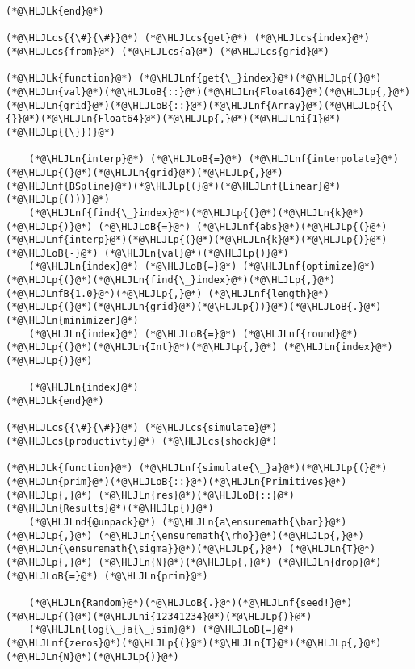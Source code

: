 \documentclass[12pt,a4paper]{article}
\newcommand{\HLJLk}[1]{\textcolor[RGB]{148,91,176}{\textbf{#1}}}
\newcommand{\HLJLn}[1]{#1}
\newcommand{\HLJLnd}[1]{\textcolor[RGB]{214,102,97}{#1}}
\newcommand{\HLJLnf}[1]{\textcolor[RGB]{66,102,213}{#1}}
\newcommand{\HLJLnfB}[1]{\textcolor[RGB]{59,151,46}{#1}}
\newcommand{\HLJLni}[1]{\textcolor[RGB]{59,151,46}{#1}}
\newcommand{\HLJLoB}[1]{\textcolor[RGB]{102,102,102}{\textbf{#1}}}
\newcommand{\HLJLp}[1]{#1}
\newcommand{\HLJLcs}[1]{\textcolor[RGB]{153,153,119}{\textit{#1}}}
\begin{document}
\begin{lstlisting}
(*@\HLJLk{end}@*)

(*@\HLJLcs{{\#}{\#}}@*) (*@\HLJLcs{get}@*) (*@\HLJLcs{index}@*) (*@\HLJLcs{from}@*) (*@\HLJLcs{a}@*) (*@\HLJLcs{grid}@*)

(*@\HLJLk{function}@*) (*@\HLJLnf{get{\_}index}@*)(*@\HLJLp{(}@*)(*@\HLJLn{val}@*)(*@\HLJLoB{::}@*)(*@\HLJLn{Float64}@*)(*@\HLJLp{,}@*) (*@\HLJLn{grid}@*)(*@\HLJLoB{::}@*)(*@\HLJLnf{Array}@*)(*@\HLJLp{{\{}}@*)(*@\HLJLn{Float64}@*)(*@\HLJLp{,}@*)(*@\HLJLni{1}@*)(*@\HLJLp{{\}})}@*)

    (*@\HLJLn{interp}@*) (*@\HLJLoB{=}@*) (*@\HLJLnf{interpolate}@*)(*@\HLJLp{(}@*)(*@\HLJLn{grid}@*)(*@\HLJLp{,}@*) (*@\HLJLnf{BSpline}@*)(*@\HLJLp{(}@*)(*@\HLJLnf{Linear}@*)(*@\HLJLp{()))}@*)
    (*@\HLJLnf{find{\_}index}@*)(*@\HLJLp{(}@*)(*@\HLJLn{k}@*)(*@\HLJLp{)}@*) (*@\HLJLoB{=}@*) (*@\HLJLnf{abs}@*)(*@\HLJLp{(}@*)(*@\HLJLnf{interp}@*)(*@\HLJLp{(}@*)(*@\HLJLn{k}@*)(*@\HLJLp{)}@*) (*@\HLJLoB{-}@*) (*@\HLJLn{val}@*)(*@\HLJLp{)}@*)
    (*@\HLJLn{index}@*) (*@\HLJLoB{=}@*) (*@\HLJLnf{optimize}@*)(*@\HLJLp{(}@*)(*@\HLJLn{find{\_}index}@*)(*@\HLJLp{,}@*) (*@\HLJLnfB{1.0}@*)(*@\HLJLp{,}@*) (*@\HLJLnf{length}@*)(*@\HLJLp{(}@*)(*@\HLJLn{grid}@*)(*@\HLJLp{))}@*)(*@\HLJLoB{.}@*)(*@\HLJLn{minimizer}@*)
    (*@\HLJLn{index}@*) (*@\HLJLoB{=}@*) (*@\HLJLnf{round}@*)(*@\HLJLp{(}@*)(*@\HLJLn{Int}@*)(*@\HLJLp{,}@*) (*@\HLJLn{index}@*)(*@\HLJLp{)}@*)

    (*@\HLJLn{index}@*)
(*@\HLJLk{end}@*)

(*@\HLJLcs{{\#}{\#}}@*) (*@\HLJLcs{simulate}@*) (*@\HLJLcs{productivty}@*) (*@\HLJLcs{shock}@*)

(*@\HLJLk{function}@*) (*@\HLJLnf{simulate{\_}a}@*)(*@\HLJLp{(}@*)(*@\HLJLn{prim}@*)(*@\HLJLoB{::}@*)(*@\HLJLn{Primitives}@*)(*@\HLJLp{,}@*) (*@\HLJLn{res}@*)(*@\HLJLoB{::}@*)(*@\HLJLn{Results}@*)(*@\HLJLp{)}@*)
    (*@\HLJLnd{@unpack}@*) (*@\HLJLn{a\ensuremath{\bar}}@*)(*@\HLJLp{,}@*) (*@\HLJLn{\ensuremath{\rho}}@*)(*@\HLJLp{,}@*) (*@\HLJLn{\ensuremath{\sigma}}@*)(*@\HLJLp{,}@*) (*@\HLJLn{T}@*)(*@\HLJLp{,}@*) (*@\HLJLn{N}@*)(*@\HLJLp{,}@*) (*@\HLJLn{drop}@*) (*@\HLJLoB{=}@*) (*@\HLJLn{prim}@*)

    (*@\HLJLn{Random}@*)(*@\HLJLoB{.}@*)(*@\HLJLnf{seed!}@*)(*@\HLJLp{(}@*)(*@\HLJLni{12341234}@*)(*@\HLJLp{)}@*)
    (*@\HLJLn{log{\_}a{\_}sim}@*) (*@\HLJLoB{=}@*) (*@\HLJLnf{zeros}@*)(*@\HLJLp{(}@*)(*@\HLJLn{T}@*)(*@\HLJLp{,}@*) (*@\HLJLn{N}@*)(*@\HLJLp{)}@*)


\end{lstlisting}
\end{document}
